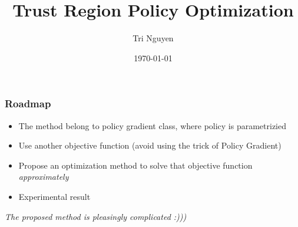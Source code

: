 \documentclass[9pt]{beamer}
\title[Reinforcement Learning]{Trust Region Policy Optimization} %
\author{Tri Nguyen} %
\institute[OSU] %
{
Summer Reading 2021 - Oregon State University \\ %
}
\date{\today} %
\theoremstyle{remark}
\begin{document}
\begin{frame}
\titlepage %
\end{frame}




\begin{frame}
\frametitle{Roadmap}
\begin{itemize}
    \item The method belong to policy gradient class, where policy is parametrizied
    \item Use another objective function (avoid using the trick of Policy Gradient)
    \item Propose an optimization method to solve that objective function \textit{approximately}
    \item Experimental result
\end{itemize}

\textit{The proposed method is pleasingly complicated :)))}
\end{frame}
\end{document}
